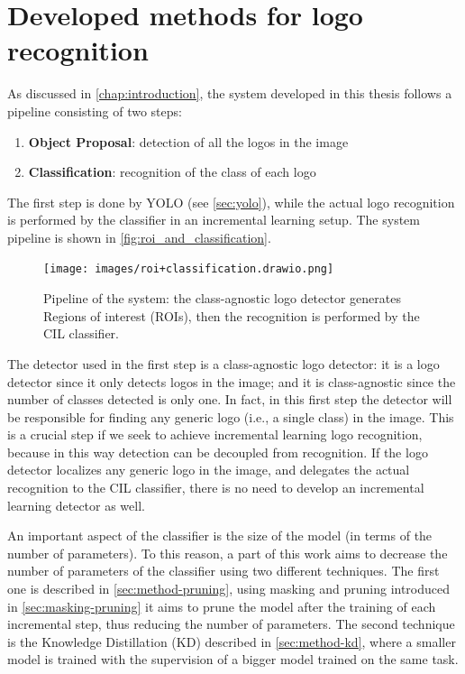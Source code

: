 \chapter{Developed methods for logo recognition}
\label{chap:methods}

As discussed in \autoref{chap:introduction}, the system developed in this thesis follows a pipeline consisting of two steps:
\begin{enumerate}
    \item \textbf{Object Proposal}: detection of all the logos in the image
    \item \textbf{Classification}: recognition of the class of each logo
\end{enumerate}
The first step is done by YOLO (see \autoref{sec:yolo}), while the actual logo recognition is performed by the classifier in an incremental learning setup. The system pipeline is shown in \autoref{fig:roi_and_classification}.

\begin{figure}%
	\centering

    \begin{center}
        \texttt{[image: images/roi+classification.drawio.png]}
    \end{center}

	\caption{Pipeline of the system: the class-agnostic logo detector generates Regions of interest (ROIs), then the recognition is performed by the CIL classifier.}%
	\label{fig:roi_and_classification}%
\end{figure}

The detector used in the first step is a class-agnostic logo detector: it is a logo detector since it only detects logos in the image; and it is class-agnostic since the number of classes detected is only one. In fact, in this first step the detector will be responsible for finding any generic logo (i.e., a single class) in the image. This is a crucial step if we seek to achieve incremental learning logo recognition, because in this way detection can be decoupled from recognition. If the logo detector localizes any generic logo in the image, and delegates the actual recognition to the CIL classifier, there is no need to develop an incremental learning detector as well.

An important aspect of the classifier is the size of the model (in terms of the number of parameters). To this reason, a part of this work aims to decrease the number of parameters of the classifier using two different techniques. The first one is described in \autoref{sec:method-pruning}, using masking and pruning introduced in \autoref{sec:masking-pruning} it aims to prune the model after the training of each incremental step, thus reducing the number of parameters. The second technique is the Knowledge Distillation (KD) described in \autoref{sec:method-kd}, where a smaller model is trained with the supervision of a bigger model trained on the same task.

